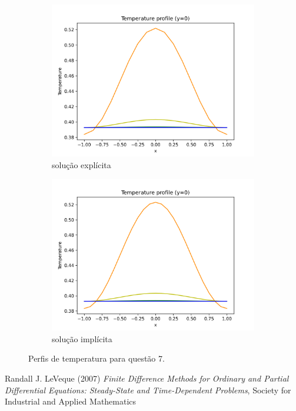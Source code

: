 \documentclass{article}
\begin{document}
\begin{figure}
\centering
     \begin{subfigure}[b]{0.49\textwidth}
         \centering
         \includegraphics[width=\textwidth]{figs/q7a_temperature_profile.png}
         \caption{solução explícita}
	\label{fig:q7a_temperature_profile}
     \end{subfigure}
     \hfill
     \begin{subfigure}[b]{0.49\textwidth}
         \centering
     \includegraphics[width=\textwidth]{figs/q7b_temperature_profile.png}
         \caption{solução implícita}
	\label{fig:q7b_temperature_profile}
     \end{subfigure}
	\caption{Perfis de temperatura para questão 7.}
\end{figure}



\begin{thebibliography}{9}
Randall J. LeVeque (2007) \emph{Finite Difference Methods for Ordinary and Partial Differential Equations:
Steady-State and Time-Dependent Problems}, Society for Industrial and Applied Mathematics 
\end{thebibliography}
\end{document}
